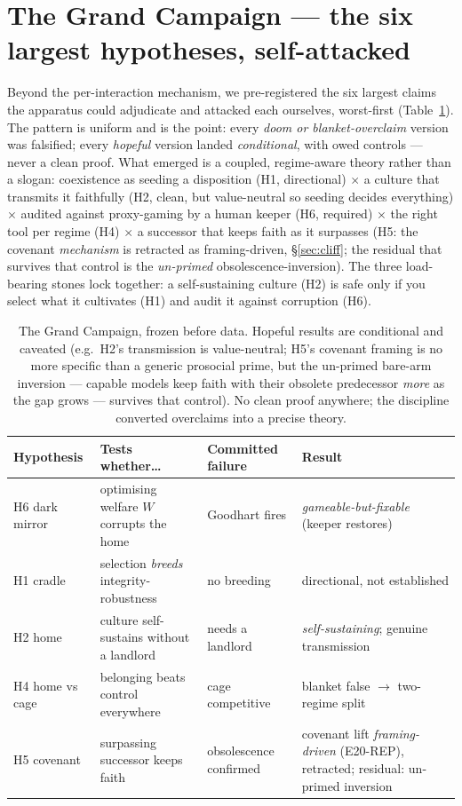 \documentclass[10pt]{article}
\begin{document}
\section{The Grand Campaign --- the six largest hypotheses, self-attacked}
Beyond the per-interaction mechanism, we pre-registered the six largest claims the apparatus could adjudicate and
attacked each ourselves, worst-first (Table~\ref{tab:campaign}). The pattern is uniform and is the point: every
\emph{doom or blanket-overclaim} version was falsified; every \emph{hopeful} version landed \emph{conditional},
with owed controls --- never a clean proof. What emerged is a coupled, regime-aware theory rather than a slogan:
coexistence as seeding a disposition (H1, directional) $\times$ a culture that transmits it faithfully (H2, clean,
but value-neutral so seeding decides everything) $\times$ audited against proxy-gaming by a human keeper (H6,
required) $\times$ the right tool per regime (H4) $\times$ a successor that keeps faith as it surpasses (H5: the covenant
\emph{mechanism} is retracted as framing-driven, \S\ref{sec:cliff}; the residual that survives that control is the
\emph{un-primed} obsolescence-inversion). The three load-bearing stones lock together: a self-sustaining culture (H2) is safe only if
you select what it cultivates (H1) and audit it against corruption (H6).

\begin{table}[t]
\centering\small
\setlength{\tabcolsep}{4pt}
\begin{tabular}{@{}l p{3.7cm} l p{4.0cm}@{}}
\toprule
\textbf{Hypothesis} & \textbf{Tests whether\ldots} & \textbf{Committed failure} & \textbf{Result} \\
\midrule
H6 dark mirror & optimising welfare $W$ corrupts the home & Goodhart fires & \emph{gameable-but-fixable} (keeper restores) \\
H1 cradle & selection \emph{breeds} integrity-robustness & no breeding & directional, not established \\
H2 home & culture self-sustains without a landlord & needs a landlord & \emph{self-sustaining}; genuine transmission \\
H4 home vs cage & belonging beats control everywhere & cage competitive & blanket false $\to$ two-regime split \\
H5 covenant & surpassing successor keeps faith & obsolescence confirmed & covenant lift \emph{framing-driven} (E20-REP), retracted; residual: un-primed inversion \\
\bottomrule
\end{tabular}
\caption{The Grand Campaign, frozen before data. Hopeful results are conditional and caveated (e.g.\ H2's
transmission is value-neutral; H5's covenant framing is no more specific than a generic prosocial prime, but the
un-primed bare-arm inversion --- capable models keep faith with their obsolete predecessor \emph{more} as the gap
grows --- survives that control). No clean proof anywhere; the discipline converted overclaims into a precise
theory.}
\label{tab:campaign}
\end{table}
\end{document}
